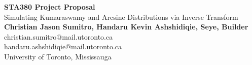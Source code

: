 \documentclass{article}
\begin{document}
\begin{center}
    \LARGE{\textbf{STA380 Project Proposal}} \\
    \vspace{1em}
    \Large{Simulating Kumaraswamy and Arcsine Distributions via Inverse Transform} \\
    \vspace{1em}
    \normalsize\textbf{Christian Jason Sumitro, Handaru Kevin Ashshidiqie, Seye, Builder} \\
    \normalsize{christian.sumitro@mail.utoronto.ca \\
    handaru.ashshidiqie@mail.utoronto.ca}\\ 
    \vspace{1em}
    \normalsize{University of Toronto, Mississauga}
\end{center}
\end{document}
